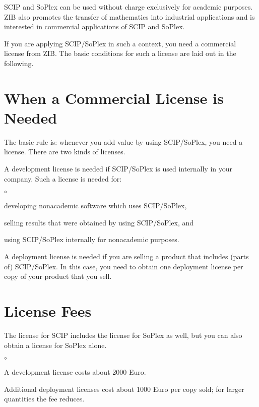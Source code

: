 \documentclass[12pt,a4paper]{article}
\date{September 2007}
\newenvironment{myitemize}{%
\begin{list}{$\circ$}%
{\setlength{\topsep}{0.5ex}%
\setlength{\partopsep}{0mm}%
\setlength{\parskip}{0ex}%
\setlength{\parsep}{0mm}%
\setlength{\itemsep}{0ex}%
\setlength{\labelwidth}{4mm}%
\setlength{\leftmargin}{0ex}%
\addtolength{\leftmargin}{\labelwidth}%
\addtolength{\leftmargin}{\labelsep}%
\setlength{\itemindent}{0mm}}}%
{\end{list}}
\begin{document}

\noindent SCIP and SoPlex can be used without charge exclusively for
academic purposes. ZIB also promotes the transfer of mathematics into
industrial applications and is interested in commercial applications of
SCIP and SoPlex.

If you are applying SCIP/SoPlex in such a context, you need a
commercial license from ZIB. The basic conditions for such a license
are laid out in the following.

\section{When a Commercial License is Needed}

The basic rule is: whenever you add value by using SCIP/SoPlex, you need a
license. There are two kinds of licenses.

A development license is needed if SCIP/SoPlex is used internally in your
company. Such a license is needed for:
\begin{myitemize}
\item developing nonacademic software which uses SCIP/SoPlex,
\item selling results that were obtained by using SCIP/SoPlex, and
\item using SCIP/SoPlex internally for nonacademic purposes.
\end{myitemize}

A deployment license is needed if you are selling a product that includes
(parts of) SCIP/SoPlex. In this case, you need to obtain one deployment
license per copy of your product that you sell.


\section{License Fees}

The license for SCIP includes the license for SoPlex as well, but you can
also obtain a license for SoPlex alone.

\begin{myitemize}
\item A development license costs about 2000 Euro.
\item Additional deployment licenses cost about 1000 Euro per copy sold;
  for larger quantities the fee reduces.
\end{myitemize}
   
\end{document}
